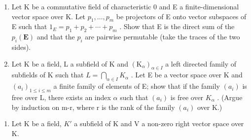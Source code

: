 \begin{enumerate}
\def\labelenumi{\arabic{enumi}.}
\setcounter{enumi}{37}
\item
  Let K be a commutative field of characteristic 0 and E a finite-dimensional vector space over K. Let \(p_{1}, \ldots, p_{m}\) be projectors of E onto vector subspaces of E such that \(1_{E} = p_{1} + p_{2} + \cdots + p_{m}\) . Show that E is the direct sum of the \(p_i(\mathbf{E})\) and that the \(p_i\) are pairwise permutable (take the traces of the two sides).
\item
  Let K be a field, L a subfield of K and \((\mathrm{K}_{\alpha})_{\alpha\in I}\) a left directed family of subfields of K such that \(L=\bigcap_{\alpha\in I}K_{\alpha}\) . Let E be a vector space over K and \((a_{i})_{1\leqslant i\leqslant m}\) a finite family of elements of E; show that if the family \((a_{i})\) is free over L, there exists an index \(\alpha\) such that \((a_{i})\) is free over \(K_{\alpha}\) . (Argue by induction on m-r, where r is the rank of the family \((a_{i})\) over K.)
\end{enumerate}

\BourbakiExercisesSection

\begin{enumerate}
\def\labelenumi{\arabic{enumi}.}
\tightlist
\item
  Let K be a field, \(K'\) a subfield of K and V a non-zero right vector space over K.
\end{enumerate}

